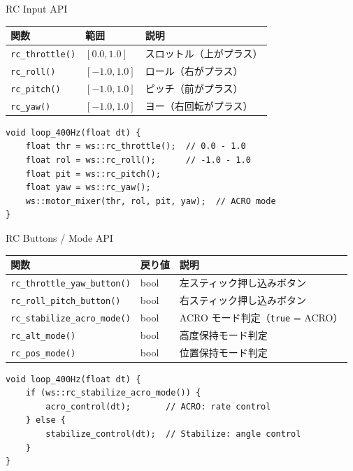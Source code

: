 \begin{frame}[fragile]{RC Input API}
  {\small
  \begin{tabular}{lll}
    \hline
    \textbf{関数} & \textbf{範囲} & \textbf{説明} \\
    \hline
    \texttt{rc\_throttle()} & $[0.0, 1.0]$   & スロットル（上がプラス） \\
    \texttt{rc\_roll()}     & $[-1.0, 1.0]$  & ロール（右がプラス） \\
    \texttt{rc\_pitch()}    & $[-1.0, 1.0]$  & ピッチ（前がプラス） \\
    \texttt{rc\_yaw()}      & $[-1.0, 1.0]$  & ヨー（右回転がプラス） \\
    \hline
  \end{tabular}
  }

  \vspace{0.3em}

  \begin{lstlisting}[style=sfcpp, basicstyle=\ttfamily\scriptsize]
void loop_400Hz(float dt) {
    float thr = ws::rc_throttle();  // 0.0 - 1.0
    float rol = ws::rc_roll();      // -1.0 - 1.0
    float pit = ws::rc_pitch();
    float yaw = ws::rc_yaw();
    ws::motor_mixer(thr, rol, pit, yaw);  // ACRO mode
}
  \end{lstlisting}
\end{frame}

\begin{frame}[fragile]{RC Buttons / Mode API}
  {\small
  \begin{tabular}{lll}
    \hline
    \textbf{関数} & \textbf{戻り値} & \textbf{説明} \\
    \hline
    \texttt{rc\_throttle\_yaw\_button()}  & bool & 左スティック押し込みボタン \\
    \texttt{rc\_roll\_pitch\_button()}    & bool & 右スティック押し込みボタン \\
    \texttt{rc\_stabilize\_acro\_mode()}  & bool & ACRO モード判定（\texttt{true} = ACRO） \\
    \texttt{rc\_alt\_mode()}             & bool & 高度保持モード判定 \\
    \texttt{rc\_pos\_mode()}             & bool & 位置保持モード判定 \\
    \hline
  \end{tabular}
  }

  \vspace{0.3em}

  \begin{lstlisting}[style=sfcpp, basicstyle=\ttfamily\scriptsize]
void loop_400Hz(float dt) {
    if (ws::rc_stabilize_acro_mode()) {
        acro_control(dt);       // ACRO: rate control
    } else {
        stabilize_control(dt);  // Stabilize: angle control
    }
}
  \end{lstlisting}
\end{frame}

